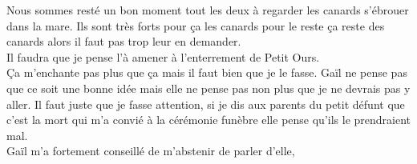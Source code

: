 Nous sommes resté un bon moment tout les deux à regarder les canards s'ébrouer dans la mare. Ils sont très forts pour ça les canards pour le reste ça reste des canards alors il faut pas trop leur en demander.\\

Il faudra que je pense l'à amener à l'enterrement de Petit Ours. \\
Ça m'enchante pas plus que ça mais il faut bien que je le fasse. Gaïl ne pense pas que ce soit une bonne idée mais elle ne pense pas non plus que je ne devrais pas y aller. Il faut juste que je fasse attention, si je dis aux parents du petit défunt que c'est la mort qui m'a convié à la cérémonie funèbre elle pense qu'ils le prendraient mal. \\
Gaïl m'a fortement conseillé de m'abstenir de parler d'elle,

